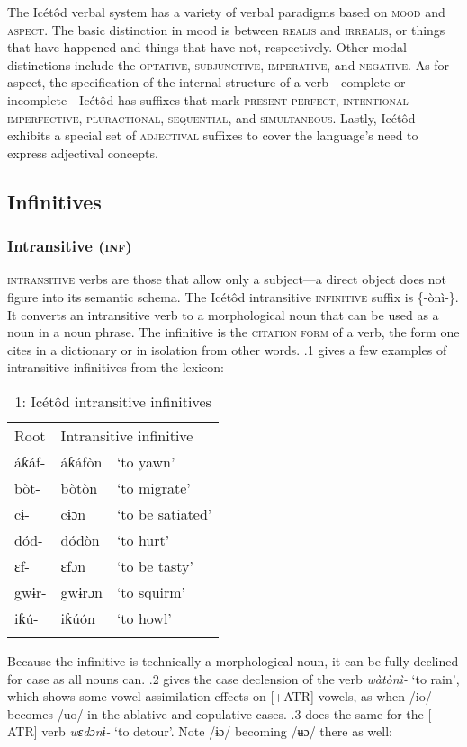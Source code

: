 The Icétôd verbal system has a variety of verbal paradigms based on \textsc{mood} and \textsc{aspect}. The basic distinction in mood is between \textsc{realis} and \textsc{irrealis}, or things that have happened and things that have not, respectively. Other modal distinctions include the \textsc{optative}, \textsc{subjunctive}, \textsc{imperative}, and \textsc{negative}. As for aspect, the specification of the internal structure of a verb—complete or incomplete—Icétôd has suffixes that mark \textsc{present perfect}, \textsc{intentional}{}-\textsc{imperfective}, \textsc{pluractional}, \textsc{sequential}, and \textsc{simultaneous}. Lastly, Icétôd exhibits a special set of \textsc{adjectival} suffixes to cover the language’s need to express adjectival concepts.




\subsection{Infinitives}
\subsubsection{Intransitive (\textsc{inf})}

\textsc{intransitive} verbs are those that allow only a subject—a direct object does not figure into its semantic schema. The Icétôd intransitive \textsc{infinitive} suffix is \{-ònì-\}. It converts an intransitive verb to a morphological noun that can be used as a noun in a noun phrase. The infinitive is the \textsc{citation} \textsc{form} of a verb, the form one cites in a dictionary or in isolation from other words. .1 gives a few examples of intransitive infinitives from the lexicon:


\begin{table}
\caption{1: Icétôd intransitive infinitives}
\label{tab:8}


\begin{tabularx}{\textwidth}{XXX}
\lsptoprule

Root & \multicolumn{2}{X}{Intransitive infinitive}\\
áƙáf- & áƙáfòn & ‘to yawn’\\
bòt- & bòtòn & ‘to migrate’\\
cɨ- & cɨɔn & ‘to be satiated’\\
dód- & dódòn & ‘to hurt’\\
ɛf- & ɛfɔn & ‘to be tasty’\\
gwɨr- & gwɨrɔn & ‘to squirm’\\
iƙú- & iƙúón & ‘to howl’\\
\lspbottomrule
\end{tabularx}
\end{table}
Because the infinitive is technically a morphological noun, it can be fully declined for case as all nouns can. .2 gives the case declension of the verb \textit{wàtònì-} ‘to rain’, which shows some vowel assimilation effects on [+ATR] vowels, as when /io/ becomes /uo/ in the ablative and copulative cases. .3 does the same for the [-ATR] verb \textit{wɛdɔnɨ-} ‘to detour’. Note /ɨɔ/ becoming /ʉɔ/ there as well:


